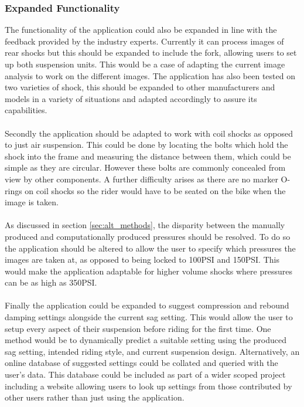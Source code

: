 		\subsubsection{Expanded Functionality}
			The functionality of the application could also be expanded in line with the feedback provided by the industry experts. Currently it can process images of rear shocks but this should be expanded to include the fork, allowing users to set up both suspension units. This would be a case of adapting the current image analysis to work on the different images. The application has also been tested on two varieties of shock, this should be expanded to other manufacturers and models in a variety of situations and adapted accordingly to assure its capabilities.
			\\\\
			Secondly the application should be adapted to work with coil shocks as opposed to just air suspension. This could be done by locating the bolts which hold the shock into the frame and measuring the distance between them, which could be simple as they are circular. However these bolts are commonly concealed from view by other components. A further difficulty arises as there are no marker O-rings on coil shocks so the rider would have to be seated on the bike when the image is taken.
			\\\\
			As discussed in section \ref{sec:alt_methods}, the disparity between the manually produced and computationally produced pressures should be resolved. To do so the application should be altered to allow the user to specify which pressures the images are taken at, as opposed to being locked to 100PSI and 150PSI. This would make the application adaptable for higher volume shocks where pressures can be as high as 350PSI.
			\\\\
			Finally the application could be expanded to suggest compression and rebound damping settings alongside the current sag setting. This would allow the user to setup every aspect of their suspension before riding for the first time. One method would be to dynamically predict a suitable setting using the produced sag setting, intended riding style, and current suspension design. Alternatively, an online database of suggested settings could be collated and queried with the user's data. This database could be included as part of a wider scoped project including a website allowing users to look up settings from those contributed by other users rather than just using the application.
